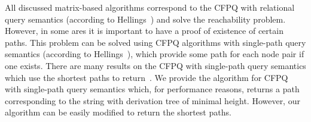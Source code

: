 All discussed matrix-based algorithms correspond to the CFPQ with relational query semantics (according to Hellings~\cite{hellingsRelational}) and solve the reachability problem. However, in some ares it is important to have a proof of existence of certain paths. This problem can be solved using CFPQ algorithms with single-path query semantics (according to Hellings~\cite{hellingsPathQuerying}), which provide some path for each node pair if one exists. There are many results on the CFPQ with single-path query semantics which use the shortest paths to return~\cite{hellingsPathQuerying,barrett2000formal,bradford2007quickest,ward2010complexity}. We provide the algorithm for CFPQ with single-path query semantics which, for performance reasons, returns a path corresponding to the string with derivation tree of minimal height. However, our algorithm can be easily modified to return the shortest paths. 

